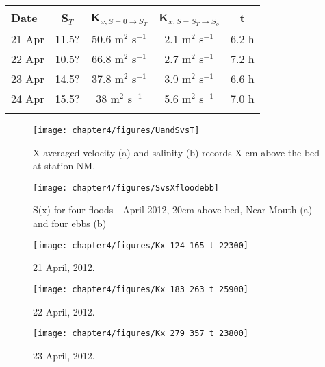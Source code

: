 \begin{center}
\begin{tabular}{| l || c | c | c | c |}
\hline
Date & S$_{T}$ & K$_{x,S=0 \rightarrow S_T}$ &  K$_{x,S=S_T \rightarrow S_o}$ & t\\
\hline \hline
21 Apr & 11.5? & 50.6 m$^2$ s$^{-1}$ & 2.1 m$^2$ s$^{-1}$ & 6.2 h\\ 

22 Apr & 10.5? & 66.8 m$^2$ s$^{-1}$ & 2.7 m$^2$ s$^{-1}$ & 7.2 h\\ 

23 Apr & 14.5? & 37.8 m$^2$ s$^{-1}$ & 3.9 m$^2$ s$^{-1}$ & 6.6 h\\ 

24 Apr & 15.5? & 38 m$^2$ s$^{-1}$ & 5.6 m$^2$ s$^{-1}$ & 7.0 h\\ 
\hline \label{tab:Kxtable}
\end{tabular}
\end{center}






\begin{figure}
	\texttt{[image: chapter4/figures/UandSvsT]} 
\caption{X-averaged velocity (a) and salinity (b) records X cm above the bed at station NM.} \label{fig:UandSvsTch4}
\end{figure}

\begin{figure}
	\texttt{[image: chapter4/figures/SvsXfloodebb]} 
\caption{S(x) for four floods - April 2012, 20cm above bed, Near Mouth (a) and four ebbs (b)} \label{fig:}
\end{figure}

\begin{figure}
	\texttt{[image: chapter4/figures/Kx\_124\_165\_t\_22300]} 
\caption{21 April, 2012. } \label{fig:Kx421}
\end{figure}

\begin{figure}
	\texttt{[image: chapter4/figures/Kx\_183\_263\_t\_25900]} 
\caption{22 April, 2012. } \label{fig:Kx422}
\end{figure}



\begin{figure}
	\texttt{[image: chapter4/figures/Kx\_279\_357\_t\_23800]} 
\caption{23 April, 2012. } \label{fig:Kx423}
\end{figure}



